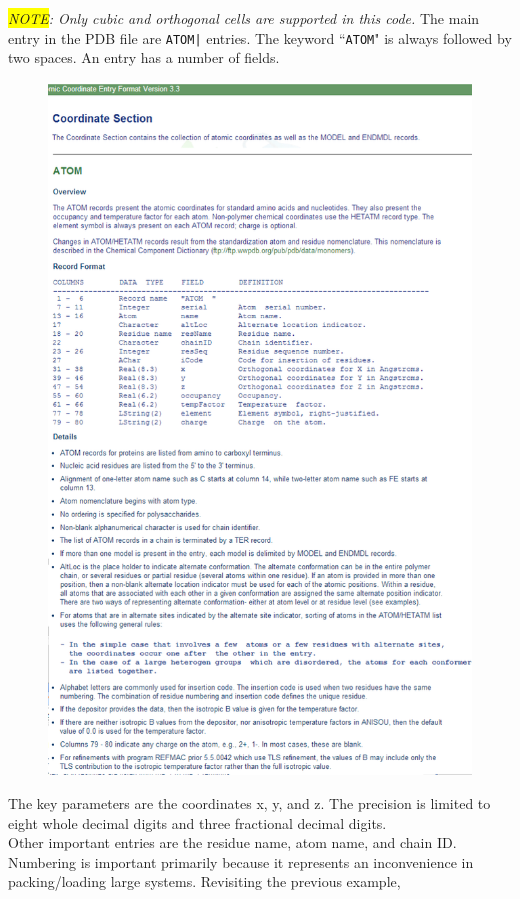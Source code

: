 \textit{\colorbox{yellow}{NOTE}: Only cubic and orthogonal cells are supported in this code.}
The main entry in the PDB file are \texttt{ATOM|} entries.  The keyword ``\texttt{ATOM}" is always followed by two spaces. An entry has a number of fields.
\begin{figure}[H]
\centering
\includegraphics[scale=1.0]{images/atom}
\end{figure}
The key parameters are the coordinates x, y, and z. The precision is limited to eight whole decimal digits and three fractional decimal digits.\\
Other important entries are the residue name, atom name, and chain ID. Numbering is important primarily because it represents an inconvenience in packing/loading large systems. Revisiting the previous example,\\\\

